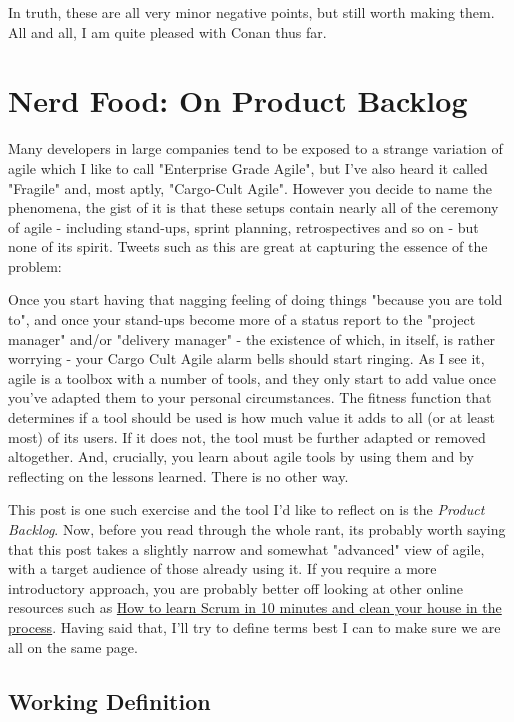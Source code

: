 \documentclass{book}
\begin{document}
In truth, these are all very minor negative points, but still worth
making them. All and all, I am quite pleased with Conan thus far.

\chapter{Nerd Food: On Product Backlog}

Many developers in large companies tend to be exposed to a strange
variation of agile which I like to call "Enterprise Grade Agile", but
I've also heard it called "Fragile" and, most aptly, "Cargo-Cult
Agile". However you decide to name the phenomena, the gist of it is
that these setups contain nearly all of the ceremony of agile -
including stand-ups, sprint planning, retrospectives and so on - but
none of its spirit. Tweets such as this are great at capturing the
essence of the problem:

Once you start having that nagging feeling of doing things "because
you are told to", and once your stand-ups become more of a status
report to the "project manager" and/or "delivery manager" - the
existence of which, in itself, is rather worrying - your Cargo Cult
Agile alarm bells should start ringing. As I see it, agile is a
toolbox with a number of tools, and they only start to add value once
you've adapted them to your personal circumstances. The fitness
function that determines if a tool should be used is how much value it
adds to all (or at least most) of its users. If it does not, the tool
must be further adapted or removed altogether. And, crucially, you
learn about agile tools by using them and by reflecting on the lessons
learned. There is no other way.

This post is one such exercise and the tool I'd like to reflect on is
the \emph{Product Backlog}. Now, before you read through the whole rant,
its probably worth saying that this post takes a slightly narrow and
somewhat "advanced" view of agile, with a target audience of those
already using it. If you require a more introductory approach, you are
probably better off looking at other online resources such as \href{http://zerodollarbill.blogspot.co.uk/2012/06/how-to-learn-scrum-in-10-minutes-and.html}{How to
learn Scrum in 10 minutes and clean your house in the process}. Having
said that, I'll try to define terms best I can to make sure we are all
on the same page.

\section*{Working Definition}
\label{sec-1}
\end{document}
